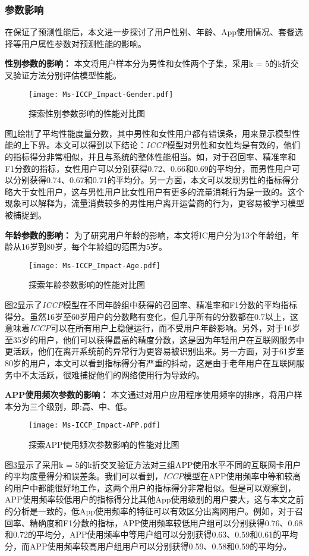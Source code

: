 \subsubsection{参数影响}
在保证了预测性能后，本文进一步探讨了用户性别、年龄、App使用情况、套餐选择等用户属性参数对预测性能的影响。\par
\textbf{性别参数的影响：}
本文将用户样本分为男性和女性两个子集，采用k = 5的k折交叉验证方法分别评估模型性能。\par
\begin{figure}[hbt]
	\centering
	\texttt{[image: Ms-ICCP\_Impact-Gender.pdf]}
	\caption{探索性别参数影响的性能对比图}
	\label{Fig:Ms-ICCP_Impact-Gender}
\end{figure}
图\ref{Fig:Ms-ICCP_Impact-Gender}绘制了平均性能度量分数，其中男性和女性用户都有错误条，用来显示模型性能的上下界。本文可以得到以下结论：\emph{ICCP}模型对男性和女性均是有效的，他们的指标得分非常相似，并且与系统的整体性能相当。如，对于召回率、精准率和F1分数的指标，女性用户可以分别获得0.72、0.66和0.69的平均分，而男性用户可以分别获得0.74、0.67和0.71的平均分。另一方面，本文可以发现男性的指标得分略大于女性用户，这与男性用户比女性用户有更多的流量消耗行为是一致的。这个现象可以解释为，流量消费较多的男性用户离开运营商的行为，更容易被学习模型被捕捉到。

\textbf{年龄参数的影响：}
为了研究用户年龄的影响，本文将IC用户分为13个年龄组，年龄从16岁到80岁，每个年龄组的范围为5岁。\par
\begin{figure}[hbt]
	\centering
	\texttt{[image: Ms-ICCP\_Impact-Age.pdf]}
	\caption{探索年龄参数影响的性能对比图}
	\label{Fig:Impact-Age}
\end{figure}
图\ref{Fig:Impact-Age}显示了\emph{ICCP}模型在不同年龄组中获得的召回率、精准率和F1分数的平均指标得分。虽然16岁至60岁用户的分数略有变化，但几乎所有的分数都在0.7以上，这意味着\emph{ICCP}可以在所有用户上稳健运行，而不受用户年龄影响。另外，对于16岁至35岁的用户，他们可以获得最高的精度分数，这是因为年轻用户在互联网服务中更活跃，他们在离开系统前的异常行为更容易被识别出来。另一方面，对于61岁至80岁的用户，本文可以看到指标得分有严重的抖动，这是由于老年用户在互联网服务中不太活跃，很难捕捉他们的网络使用行为导致的。

\textbf{APP使用频次参数的影响：}
本文通过对用户应用程序使用频率的排序，将用户样本分为三个级别，即:高、中、低。\par
\begin{figure}[!hbt]
	\centering
	\texttt{[image: Ms-ICCP\_Impact-APP.pdf]}
	\caption{探索APP使用频次参数影响的性能对比图}
	\label{Fig:Impact-APP}
\end{figure}
图\ref{Fig:Impact-APP}显示了采用k = 5的k折交叉验证方法对三组APP使用水平不同的互联网卡用户的平均度量得分和误差条。我们可以看到，\emph{ICCP}模型在APP使用频率中等和较高的用户中都能很好地工作，这两个用户的指标得分非常相似。但是可以观察到，APP使用频率较低用户的指标得分比其他App使用级别的用户要大，这与本文之前的分析是一致的，低App使用频率的特征可以有效区分出离网用户。例如，对于召回率、精确度和F1分数的指标，APP使用频率较低用户组可以分别获得0.76、0.68和0.72的平均分，APP使用频率中等用户组可以分别获得0.63、0.59和0.61的平均分，而APP使用频率较高用户组用户可以分别获得0.59、0.58和0.59的平均分。

